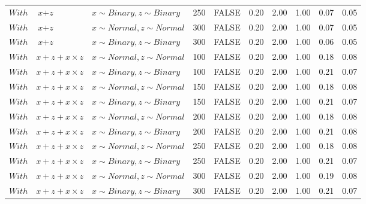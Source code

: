 \begin{longtable}{lllrlrrrrr}
  $With$ & $\textit{x} + \textit{z}$ & $\textit{x} \sim Binary, \textit{z} \sim Binary$ & 250 & FALSE & 0.20 & 2.00 & 1.00 & 0.07 & 0.05 \\ 
  $With$ & $\textit{x} + \textit{z}$ & $\textit{x} \sim Normal , \textit{z} \sim Normal$ & 300 & FALSE & 0.20 & 2.00 & 1.00 & 0.07 & 0.05 \\ 
  $With$ & $\textit{x} + \textit{z}$ & $\textit{x} \sim Binary, \textit{z} \sim Binary$ & 300 & FALSE & 0.20 & 2.00 & 1.00 & 0.06 & 0.05 \\ 
  $With$ & $\textit{x} + \textit{z} + \textit{x} \times \textit{z}$ & $\textit{x} \sim Normal , \textit{z} \sim Normal$ & 100 & FALSE & 0.20 & 2.00 & 1.00 & 0.18 & 0.08 \\ 
  $With$ & $\textit{x} + \textit{z} + \textit{x} \times \textit{z}$ & $\textit{x} \sim Binary, \textit{z} \sim Binary$ & 100 & FALSE & 0.20 & 2.00 & 1.00 & 0.21 & 0.07 \\ 
  $With$ & $\textit{x} + \textit{z} + \textit{x} \times \textit{z}$ & $\textit{x} \sim Normal , \textit{z} \sim Normal$ & 150 & FALSE & 0.20 & 2.00 & 1.00 & 0.18 & 0.08 \\ 
  $With$ & $\textit{x} + \textit{z} + \textit{x} \times \textit{z}$ & $\textit{x} \sim Binary, \textit{z} \sim Binary$ & 150 & FALSE & 0.20 & 2.00 & 1.00 & 0.21 & 0.07 \\ 
  $With$ & $\textit{x} + \textit{z} + \textit{x} \times \textit{z}$ & $\textit{x} \sim Normal , \textit{z} \sim Normal$ & 200 & FALSE & 0.20 & 2.00 & 1.00 & 0.18 & 0.08 \\ 
  $With$ & $\textit{x} + \textit{z} + \textit{x} \times \textit{z}$ & $\textit{x} \sim Binary, \textit{z} \sim Binary$ & 200 & FALSE & 0.20 & 2.00 & 1.00 & 0.21 & 0.08 \\ 
  $With$ & $\textit{x} + \textit{z} + \textit{x} \times \textit{z}$ & $\textit{x} \sim Normal , \textit{z} \sim Normal$ & 250 & FALSE & 0.20 & 2.00 & 1.00 & 0.18 & 0.08 \\ 
  $With$ & $\textit{x} + \textit{z} + \textit{x} \times \textit{z}$ & $\textit{x} \sim Binary, \textit{z} \sim Binary$ & 250 & FALSE & 0.20 & 2.00 & 1.00 & 0.21 & 0.07 \\ 
  $With$ & $\textit{x} + \textit{z} + \textit{x} \times \textit{z}$ & $\textit{x} \sim Normal , \textit{z} \sim Normal$ & 300 & FALSE & 0.20 & 2.00 & 1.00 & 0.19 & 0.08 \\ 
  $With$ & $\textit{x} + \textit{z} + \textit{x} \times \textit{z}$ & $\textit{x} \sim Binary, \textit{z} \sim Binary$ & 300 & FALSE & 0.20 & 2.00 & 1.00 & 0.21 & 0.07 \\ 

\end{longtable}
